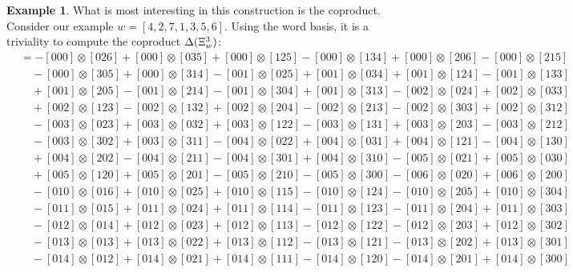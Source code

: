 \documentclass{amsart}
\theoremstyle{definition}
\newtheorem{example}[lemma]{Example}
\theoremstyle{remark}
\numberwithin{equation}{subsection}
\begin{document}
\begin{example} \label{example:coproduct}
What is most interesting in this construction is the coproduct. Consider our example $w=[4,2,7,1,3,5,6]$. Using the word basis, it is a triviality to compute the coproduct $\Delta(\Xi_w^3)$:
\begin{align*}
&= - [000] \otimes [026] + [000] \otimes [035] + [000] \otimes [125] - [000] \otimes [134] + [000] \otimes [206] - [000] \otimes [215] \\
&\quad - [000] \otimes [305] + [000] \otimes [314] - [001] \otimes [025] + [001] \otimes [034] + [001] \otimes [124] - [001] \otimes [133] \\
&\quad + [001] \otimes [205] - [001] \otimes [214] - [001] \otimes [304] + [001] \otimes [313] - [002] \otimes [024] + [002] \otimes [033] \\
&\quad + [002] \otimes [123] - [002] \otimes [132] + [002] \otimes [204] - [002] \otimes [213] - [002] \otimes [303] + [002] \otimes [312] \\
&\quad - [003] \otimes [023] + [003] \otimes [032] + [003] \otimes [122] - [003] \otimes [131] + [003] \otimes [203] - [003] \otimes [212] \\
&\quad - [003] \otimes [302] + [003] \otimes [311] - [004] \otimes [022] + [004] \otimes [031] + [004] \otimes [121] - [004] \otimes [130] \\
&\quad + [004] \otimes [202] - [004] \otimes [211] - [004] \otimes [301] + [004] \otimes [310] - [005] \otimes [021] + [005] \otimes [030] \\
&\quad + [005] \otimes [120] + [005] \otimes [201] - [005] \otimes [210] - [005] \otimes [300] - [006] \otimes [020] + [006] \otimes [200] \\
&\quad - [010] \otimes [016] + [010] \otimes [025] + [010] \otimes [115] - [010] \otimes [124] - [010] \otimes [205] + [010] \otimes [304] \\
&\quad - [011] \otimes [015] + [011] \otimes [024] + [011] \otimes [114] - [011] \otimes [123] - [011] \otimes [204] + [011] \otimes [303] \\
&\quad - [012] \otimes [014] + [012] \otimes [023] + [012] \otimes [113] - [012] \otimes [122] - [012] \otimes [203] + [012] \otimes [302] \\
&\quad - [013] \otimes [013] + [013] \otimes [022] + [013] \otimes [112] - [013] \otimes [121] - [013] \otimes [202] + [013] \otimes [301] \\
&\quad - [014] \otimes [012] + [014] \otimes [021] + [014] \otimes [111] - [014] \otimes [120] - [014] \otimes [201] + [014] \otimes [300] \\

\end{align*}
\end{example}
\end{document}
